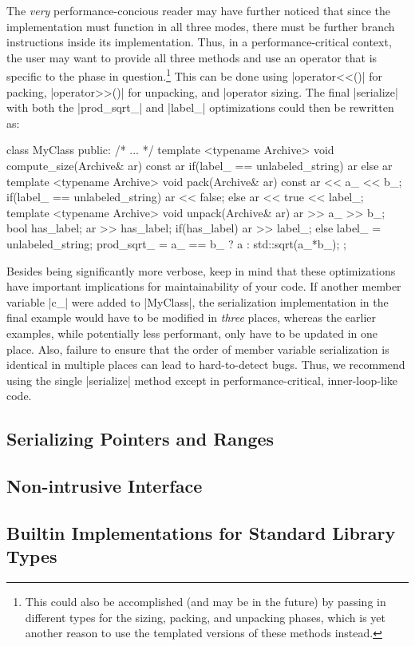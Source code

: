The {\it very} performance-concious reader may have further noticed that since
the  implementation must function in all three modes,
there must be further branch instructions inside its implementation.  Thus, in a
performance-critical context, the user may want to provide all three methods and
use an operator that is specific to the phase in question.\footnote{This could
also be accomplished (and may be in the future) by passing in different types
for the sizing, packing, and unpacking phases, which is yet another reason to
use the templated versions of these methods instead.}  This can be done using
|operator<<()| for packing, |operator>>()| for unpacking, and |operator%
sizing.  The final |serialize| with both the |prod_sqrt_| and |label_|
optimizations could then be rewritten as:
%
\begin{CppCodeNumb}
class MyClass {
  public:
    /* ... */
    template <typename Archive>
    void compute_size(Archive& ar) const {
      ar %
      if(label_ == unlabeled_string) ar %
      else ar %
    }
    template <typename Archive>
    void pack(Archive& ar) const {
      ar << a_ << b_;
      if(label_ == unlabeled_string) ar << false;
      else ar << true << label_;
    }
    template <typename Archive>
    void unpack(Archive& ar) {
      ar >> a_ >> b_;
      bool has_label;
      ar >> has_label;
      if(has_label) ar >> label_;
      else label_ = unlabeled_string;
      prod_sqrt_ = a_ == b_ ? a : std::sqrt(a_*b_);
    }
};
\end{CppCodeNumb}
%
Besides being significantly more verbose, keep in mind that these optimizations
have important implications for maintainability of your code.  If another member
variable |c_| were added to |MyClass|, the serialization implementation in the
final example would have to be modified in {\it three} places, whereas the
earlier examples, while potentially less performant, only have to be updated in
one place.  Also, failure to ensure that the order of member variable
serialization is identical in multiple places can lead to hard-to-detect bugs. 
Thus, we recommend using the single |serialize| method except in
performance-critical, inner-loop-like code.


\subsection{Serializing Pointers and Ranges}

\subsection{Non-intrusive Interface}

\subsection{Builtin Implementations for Standard Library Types}

\lstDeleteShortInline{\|}
